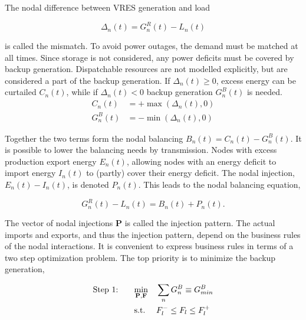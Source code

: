 \documentclass[a4paper, 5p, sort&compress]{elsarticle}%
\newcommand{\paren}[1]{\left(#1\right)}
\begin{document}
The nodal difference between VRES generation and load

\begin{equation}
  \Delta_{n}(t) = G^{R}_{n}(t) - L_{n}(t)
\end{equation}

is called the mismatch. To avoid power outages, the demand must be
matched at all times. Since storage is not considered, any power
deficits must be covered by backup generation. Dispatchable
resources are not modelled explicitly, but are considered a part of
the backup generation. If $\Delta_{n}(t) \geq 0$, excess energy can be
curtailed $C_{n}(t)$, while if $\Delta_{n}(t) < 0$ backup generation
$G^{B}_{n}(t)$ is needed.
\begin{align}
  C_{n}(t) &= + \max \paren{\Delta_{n}(t),0} \\
  G^{B}_{n}(t) &= - \min \phantom{} \paren{\Delta_{n}(t),0} 
\end{align}

Together the two terms form the nodal balancing
$B_{n}(t) = C_{n}(t) - G^{B}_{n}(t)$.  It is possible to lower the
balancing needs by transmission. Nodes with excess production export
energy $E_{n}(t)$, allowing nodes with an energy deficit to import
energy $I_{n}(t)$ to (partly) cover their energy deficit. The nodal
injection, $E_{n}(t) - I_{n}(t)$, is denoted $P_{n}(t)$. This leads to
the nodal balancing equation,

\begin{equation}
  \label{eq:nodal-balancing}
  G^{R}_{n}(t) - L_{n}(t) = B_{n}(t) + P_{n}(t) .
\end{equation}

The vector of nodal injections $\mathbf{P}$ is called the injection
pattern. The actual imports and exports, and thus the injection
pattern, depend on the business rules of the nodal interactions. It is
convenient to express business rules in terms of a two step
optimization problem. The top priority is to minimize the backup
generation,

\begin{equation}
  \label{eq:step1}
  \begin{aligned}
    \text{Step 1: \hspace{15pt}}& \underset{\mathbf{P}, \mathbf{F}}{\text{min}}
    & & \sum_{n} G_{n}^{B} \equiv G^{B}_{min} \\
    & \text{s.t.}
    & & F_{l}^{-} \leq F_{l} \leq F_{l}^{+}
  \end{aligned}
\end{equation}
\end{document}
